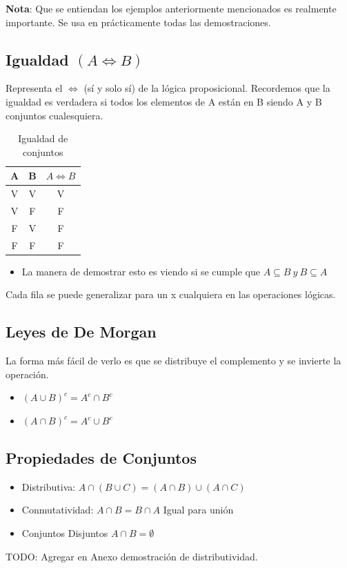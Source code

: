 \documentclass[10pt,a4paper]{article}
\begin{document}
\textbf{Nota}: Que se entiendan los ejemplos anteriormente mencionados es realmente importante. Se usa en prácticamente todas las demostraciones.\subsection*{Igualdad $(A \iff B)$}
Representa el $\iff$ (sí y solo sí) de la lógica proposicional. Recordemos que la igualdad es verdadera si todos los elementos de A están en B siendo A y B conjuntos cualesquiera. \\
\begin{table}[h!]
    \centering
    \begin{tabular}{|c | c | c|}
    \hline
    \textbf{A} & \textbf{B} & \textbf{$A \iff B$} \\[0.1cm]
    \hline
    V & V & V \\
    V & F & F \\
    F & V & F \\
    F & F & F \\
    \hline
    \end{tabular}
    \caption{Igualdad de conjuntos}
\end{table} 
\begin{itemize}
    \item La manera de demostrar esto es viendo si se cumple que $A \subseteq B \ y \ B \subseteq A$
\end{itemize}
Cada fila se puede generalizar para un x cualquiera en las operaciones lógicas. 
\subsection*{Leyes de De Morgan}
La forma más fácil de verlo es que se distribuye el complemento y se invierte la operación.
\begin{itemize}
    \item $(A \cup B)^{c} = A^{c} \cap B^{c}$
    \item $(A \cap B)^{c} = A^{c} \cup B^{c}$
\end{itemize}
\subsection*{Propiedades de Conjuntos}
\begin{itemize}
    \item Distributiva: $A \cap (B \cup C) = (A \cap B) \cup (A \cap C)$
    \item Conmutatividad: $A \cap B = B \cap A $ Igual para unión
    \item Conjuntos Disjuntos $ A \cap B = \emptyset$
\end{itemize}
TODO: Agregar en Anexo demostración de distributividad.
\end{document}
